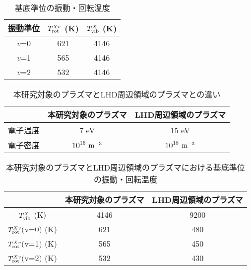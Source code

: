 \begin{table}
    \caption{基底準位の振動・回転温度}
    \label{table:fitting-result}
    \centering
    \begin{tabular}{ccc}
        \hline
        振動準位 & $T^{Xv}_{\rm rot}$ (K) & $T^{X}_{\rm vib}$ (K)\\
        \hline
        $v$=0 & 621 & 4146\\
        $v$=1 & 565 & 4146\\
        $v$=2 & 532 & 4146\\
        \hline
    \end{tabular}
\end{table}

\begin{table}
    \caption{本研究対象のプラズマとLHD周辺領域のプラズマとの違い}
    \label{table:LHD-and-this-plasma}
    \centering
    \begin{tabular}{ccc}
        \hline
         & 本研究対象のプラズマ & LHD周辺領域のプラズマ\\
        \hline
        電子温度 & 7 eV & 15 eV\\
        電子密度 & $10^{16}$ $\rm m^{-3}$ & $10^{18}$ $\rm m^{-3}$\\
        \hline
    \end{tabular}
\end{table}

\begin{table}
    \caption{本研究対象のプラズマとLHD周辺領域のプラズマにおける基底準位の振動・回転温度}
    \label{table:ground-result-compare}
    \centering
    \begin{tabular}{ccc}
        \hline
        & 本研究対象のプラズマ & LHD周辺領域のプラズマ\\
        \hline
        $T^X_{\rm vib}$ (K)& 4146 & 9200\\
        $T^{Xv}_{\rm rot}($v=0$)$ (K)& 621 & 480\\
        $T^{Xv}_{\rm rot}($v=1$)$ (K)& 565 & 450\\
        $T^{Xv}_{\rm rot}($v=2$)$ (K)& 532 & 430\\
        \hline
    \end{tabular}
\end{table}

